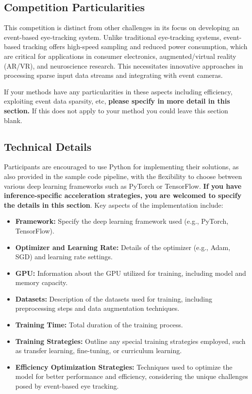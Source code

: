 \documentclass{article}
\begin{document}
\subsection{Competition Particularities}
This competition is distinct from other challenges in its focus on developing an event-based eye-tracking system. Unlike traditional eye-tracking systems, event-based tracking offers high-speed sampling and reduced power consumption, which are critical for applications in consumer electronics, augmented/virtual reality (AR/VR), and neuroscience research. This necessitates innovative approaches in processing sparse input data streams and integrating with event cameras. 

If your methods have any particularities in these aspects including efficiency, exploiting event data sparsity, etc, \textbf{please specify in more detail in this section.} If this does not apply to your method you could leave this section blank.

\subsection{Technical Details}
Participants are encouraged to use Python for implementing their solutions, as also provided in the sample code pipeline, with the flexibility to choose between various deep learning frameworks such as PyTorch or TensorFlow. \textbf{If you have inference-specific acceleration strategies, you are welcomed to specify the details in this section}. Key aspects of the implementation include:

\begin{itemize}
    \item \textbf{Framework:} Specify the deep learning framework used (e.g., PyTorch, TensorFlow).
    \item \textbf{Optimizer and Learning Rate:} Details of the optimizer (e.g., Adam, SGD) and learning rate settings.
    \item \textbf{GPU:} Information about the GPU utilized for training, including model and memory capacity.
    \item \textbf{Datasets:} Description of the datasets used for training, including preprocessing steps and data augmentation techniques.
    \item \textbf{Training Time:} Total duration of the training process.
    \item \textbf{Training Strategies:} Outline any special training strategies employed, such as transfer learning, fine-tuning, or curriculum learning.
    \item \textbf{Efficiency Optimization Strategies:} Techniques used to optimize the model for better performance and efficiency, considering the unique challenges posed by event-based eye tracking.
\end{itemize}
\end{document}
